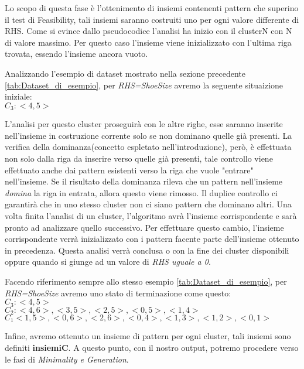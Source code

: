 Lo scopo di questa fase è l'ottenimento di insiemi contenenti pattern che superino il test di Feasibility, tali insiemi saranno costruiti uno per ogni valore differente di RHS.
Come si evince dallo pseudocodice l'analisi ha inizio con il clusterN con N di valore massimo.
Per questo caso l'insieme viene inizializzato con l'ultima riga trovata, essendo l'insieme ancora vuoto.
\begin{center}
	Analizzando l'esempio di dataset mostrato nella sezione precedente \ref{tab:Dataset_di_esempio}, per \emph{RHS=ShoeSize} avremo la seguente situaizione iniziale:\\
	$C_3: {<4,5>}$\\
\end{center}
L'analisi per questo cluster proseguirà con le altre righe, esse saranno inserite nell'insieme in costruzione corrente solo se non dominano quelle già presenti. La verifica della dominanza(concetto espletato nell'introduzione), però, è effettuata non solo dalla riga da inserire verso quelle già presenti, tale controllo viene effettuato anche dai pattern esistenti verso la riga che vuole "entrare" nell'insieme. Se il risultato della dominanza rileva che un pattern nell'insieme \emph{domina} la riga in entrata, allora questo viene rimosso.
Il duplice controllo ci garantirà che in uno stesso cluster non ci siano pattern che dominano altri.
Una volta finita l'analisi di un cluster, l'algoritmo avrà l'insieme corrispondente e sarà pronto ad analizzare quello successivo. Per effettuare questo cambio, l'insieme corrispondente verrà inizializzato con i pattern facente parte dell'insieme ottenuto in precedenza.
Questa analisi verrà conclusa o con la fine dei cluster disponibili oppure quando si giunge ad un valore di \emph{RHS uguale a 0}.
\begin{center}
	Facendo riferimento sempre allo stesso esempio \ref{tab:Dataset_di_esempio}, per \emph{RHS=ShoeSize} avremo uno stato di terminazione come questo:\\
	$C_3: {<4,5>}$\\
	$C_2: {<4,6>, <3,5>, <2,5>, <0,5>, <1,4>}$\\
	$C_1 {<1,5>, <0,6>, <2,6>, <0,4>, <1,3>, <1,2>, <0,1>}$\\
\end{center}
Infine, avremo ottenuto un insieme di pattern per ogni cluster, tali insiemi sono definiti \textbf{insiemiC}.
A questo punto, con il nostro output, potremo procedere verso le fasi di \emph{Minimality e Generation}.